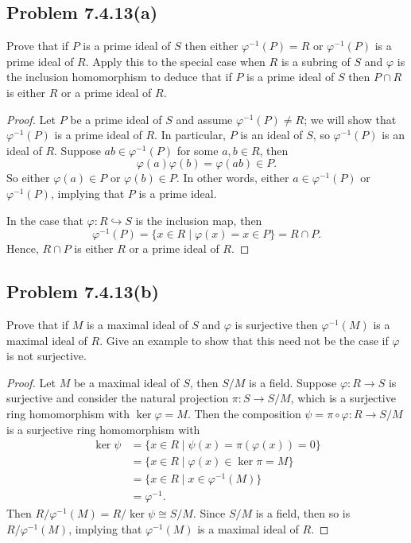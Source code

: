 \documentclass[12pt]{article}
\newenvironment{problem}
    {\begin{lrbox}{\mybox}\begin{minipage}{0.98\textwidth}}
    {\end{minipage}\end{lrbox}\begin{center}\framebox[\textwidth]{\usebox{\mybox}}\end{center}}
\theoremstyle{definition}
\renewcommand{\phi}{\varphi}
\newcommand{\<}{\left\langle}
\renewcommand{\>}{\right\rangle}
\newcommand{\inc}{\hookrightarrow}
\newcommand{\isom}{\cong}
\begin{document}
\subsection{Problem 7.4.13(a)}
\begin{problem}
    Prove that if $P$ is a prime ideal of $S$ then either $\phi^{-1}(P) = R$ or $\phi^{-1}(P)$ is a prime ideal of $R$. Apply this to the special case when $R$ is a subring of $S$ and $\phi$ is the inclusion homomorphism to deduce that if $P$ is a prime ideal of $S$ then $P \cap R$ is either $R$ or a prime ideal of $R$.
\end{problem}

\begin{proof}
    Let $P$ be a prime ideal of $S$ and assume $\phi^{-1}(P) \ne R$; we will show that $\phi^{-1}(P)$ is a prime ideal of $R$. In particular, $P$ is an ideal of $S$, so $\phi^{-1}(P)$ is an ideal of $R$. Suppose $ab \in \phi^{-1}(P)$ for some $a, b \in R$, then
    \[
        \phi(a)\phi(b) = \phi(ab) \in P.
    \]
    So either $\phi(a) \in P$ or $\phi(b) \in P$. In other words, either $a \in \phi^{-1}(P)$ or $\phi^{-1}(P)$, implying that $P$ is a prime ideal.
    
    In the case that $\phi : R \inc S$ is the inclusion map, then
    \[
        \phi^{-1}(P) = \{x \in R \mid \phi(x) = x \in P\} = R \cap P.
    \]
    Hence, $R \cap P$ is either $R$ or a prime ideal of $R$.
    
\end{proof}

\subsection{Problem 7.4.13(b)}
\begin{problem}
    Prove that if $M$ is a maximal ideal of $S$ and $\phi$ is surjective then $\phi^{-1}(M)$ is a maximal ideal of $R$. Give an example to show that this need not be the case if $\phi$ is not surjective.
\end{problem}

\begin{proof}
    Let $M$ be a maximal ideal of $S$, then $S/M$ is a field. Suppose $\phi : R \to S$ is surjective and consider the natural projection $\pi : S \to S/M$, which is a surjective ring homomorphism with $\ker\phi = M$. Then the composition $\psi = \pi \circ \phi : R \to S/M$ is a surjective ring homomorphism with
    \begin{align*}
        \ker \psi 
            &= \{x \in R \mid \psi(x) = \pi(\phi(x)) = 0\} \\
            &= \{x \in R \mid \phi(x) \in \ker \pi = M\} \\
            &= \{x \in R \mid x \in \phi^{-1}(M)\} \\
            &= \phi^{-1}.
    \end{align*}
    Then $R/\phi^{-1}(M) = R/\ker\psi \isom S/M$. Since $S/M$ is a field, then so is $R/\phi^{-1}(M)$, implying that $\phi^{-1}(M)$ is a maximal ideal of $R$.
    
\end{proof}
\end{document}
